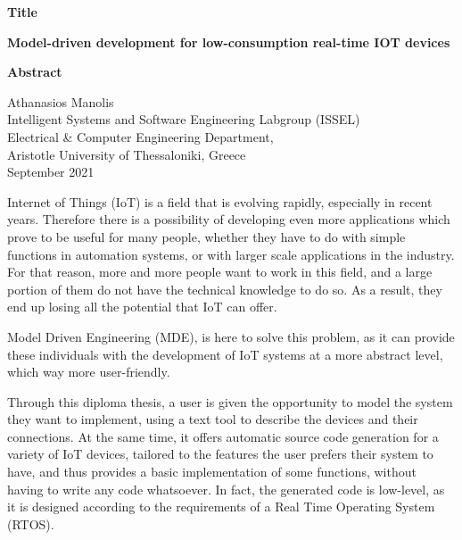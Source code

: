 {\selectfont

{}


\begin{center}
  \centering
  \textbf{\Large{Title}}
  \vspace{0.5cm}

  \textbf{\large{Model-driven development for low-consumption real-time IOT devices}}

  \vspace{1cm}

  \centering
  \textbf{Abstract}
\end{center}


\begin{flushright}
  \vspace{2cm}
  Athanasios Manolis
  \\
  Intelligent Systems and Software Engineering Labgroup (ISSEL)
  \\
  Electrical \& Computer Engineering Department,
  \\
  Aristotle University of Thessaloniki, Greece
  \\
  September 2021
\end{flushright}

}

Internet of Things (IoT) is a field that is evolving rapidly, especially in recent years. Therefore there is a possibility of developing even more applications which prove to be useful for many people, whether they have to do with simple functions in automation systems, or with larger scale applications in the industry. For that reason, more and more people want to work in this field, and a large portion of them do not have the technical knowledge to do so. As a result, they end up losing all the potential that IoT can offer.

Model Driven Engineering (MDE), is here to solve this problem, as it can provide these individuals with the development of IoT systems at a more abstract level, which way more user-friendly.

Through this diploma thesis, a user is given the opportunity to model the system they want to implement, using a text tool to describe the devices and their connections. At the same time, it offers automatic source code generation for a variety of IoT devices, tailored to the features the user prefers their system to have, and thus provides a basic implementation of some functions, without having to write any code whatsoever. In fact, the generated code is low-level, as it is designed according to the requirements of a Real Time Operating System (RTOS).
